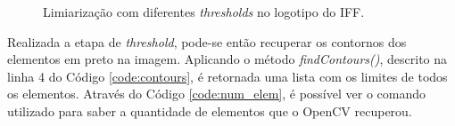 \begin{figure}[H]
	\centering
	\hspace{3em}
	\caption{Limiarização com diferentes \textit{thresholds} no logotipo do IFF.}
	\label{img:threshold_logotipo}
\end{figure}

Realizada a etapa de \textit{threshold}, pode-se então recuperar os contornos dos elementos em preto na imagem. Aplicando o método \textit{findContours()}, descrito na linha 4 do Código \ref{code:contours}, é retornada uma lista com os limites de todos os elementos. Através do Código \ref{code:num_elem}, é possível ver o comando utilizado para saber a quantidade de elementos que o OpenCV recuperou.


